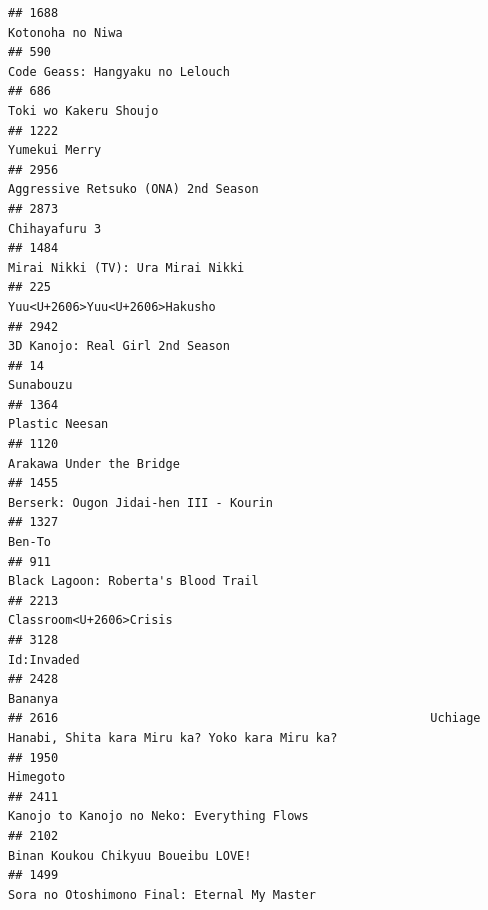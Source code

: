 \documentclass[
]{article}
\begin{document}
\begin{verbatim}
## 1688                                                                                          Kotonoha no Niwa
## 590                                                                            Code Geass: Hangyaku no Lelouch
## 686                                                                                      Toki wo Kakeru Shoujo
## 1222                                                                                             Yumekui Merry
## 2956                                                                       Aggressive Retsuko (ONA) 2nd Season
## 2873                                                                                             Chihayafuru 3
## 1484                                                                         Mirai Nikki (TV): Ura Mirai Nikki
## 225                                                                              Yuu<U+2606>Yuu<U+2606>Hakusho
## 2942                                                                           3D Kanojo: Real Girl 2nd Season
## 14                                                                                                   Sunabouzu
## 1364                                                                                            Plastic Neesan
## 1120                                                                                  Arakawa Under the Bridge
## 1455                                                                     Berserk: Ougon Jidai-hen III - Kourin
## 1327                                                                                                    Ben-To
## 911                                                                        Black Lagoon: Roberta's Blood Trail
## 2213                                                                                   Classroom<U+2606>Crisis
## 3128                                                                                                Id:Invaded
## 2428                                                                                                   Bananya
## 2616                                                    Uchiage Hanabi, Shita kara Miru ka? Yoko kara Miru ka?
## 1950                                                                                                  Himegoto
## 2411                                                                Kanojo to Kanojo no Neko: Everything Flows
## 2102                                                                        Binan Koukou Chikyuu Boueibu LOVE!
## 1499                                                               Sora no Otoshimono Final: Eternal My Master

\end{verbatim}
\end{document}
